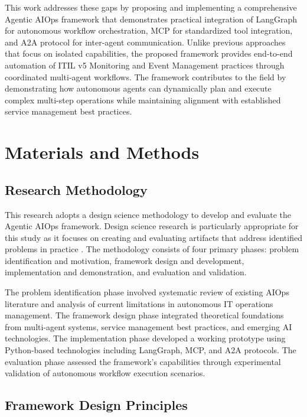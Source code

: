 \documentclass{article}
\begin{document}
This work addresses these gaps by proposing and implementing a comprehensive Agentic AIOps framework that demonstrates practical integration of LangGraph for autonomous workflow orchestration, MCP for standardized tool integration, and A2A protocol for inter-agent communication. Unlike previous approaches that focus on isolated capabilities, the proposed framework provides end-to-end automation of ITIL v5 Monitoring and Event Management practices through coordinated multi-agent workflows. The framework contributes to the field by demonstrating how autonomous agents can dynamically plan and execute complex multi-step operations while maintaining alignment with established service management best practices.

\section{Materials and Methods}

\subsection{Research Methodology}

This research adopts a design science methodology to develop and evaluate the Agentic AIOps framework. Design science research is particularly appropriate for this study as it focuses on creating and evaluating artifacts that address identified problems in practice \cite{hevner2004}. The methodology consists of four primary phases: problem identification and motivation, framework design and development, implementation and demonstration, and evaluation and validation.

The problem identification phase involved systematic review of existing AIOps literature and analysis of current limitations in autonomous IT operations management. The framework design phase integrated theoretical foundations from multi-agent systems, service management best practices, and emerging AI technologies. The implementation phase developed a working prototype using Python-based technologies including LangGraph, MCP, and A2A protocols. The evaluation phase assessed the framework's capabilities through experimental validation of autonomous workflow execution scenarios.

\subsection{Framework Design Principles}
\end{document}
